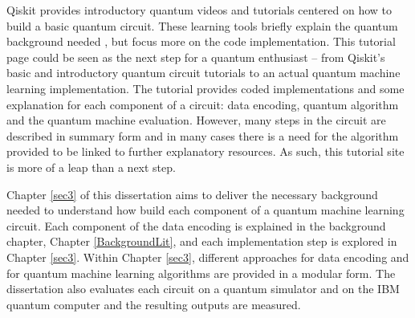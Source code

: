 Qiskit provides introductory quantum videos and tutorials \citep{qiskit_videos_code} centered on how to build a basic quantum circuit. These learning tools briefly explain the quantum background needed \citep{qiskit_videos_background}, but focus more on the code implementation. This tutorial page could be seen as the next step for a quantum enthusiast -- from Qiskit’s basic and introductory quantum circuit tutorials to an actual quantum machine learning implementation. The tutorial provides coded implementations and some explanation for each component of a circuit: data encoding, quantum algorithm and the quantum machine evaluation. However, many steps in the circuit are described in summary form and in many cases there is a need for the algorithm provided to be linked to further explanatory resources. As such, this tutorial site is more of a leap than a next step.%

 Chapter \ref{sec3} of this dissertation aims to deliver the necessary background needed to understand how build each component of a quantum machine learning circuit. Each component of the data encoding is explained in the background chapter, Chapter \ref{BackgroundLit}, and each implementation step is explored in Chapter \ref{sec3}. Within Chapter \ref{sec3}, different approaches for data encoding and for quantum machine learning algorithms are provided in a modular form. The dissertation also evaluates each circuit on a quantum simulator and on the IBM quantum computer and the resulting outputs are measured.

